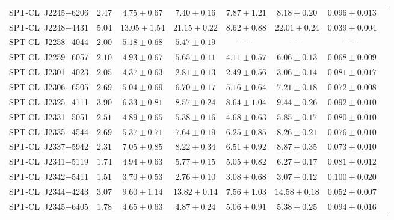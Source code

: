 \begin{table}
{\begin{tabular}{lccccccc}
    SPT-CL~J2245$-$6206    &$ 2.47 $    &$ 4.75 \pm 0.67 $    &$ 7.40 \pm 0.16 $    &$ 7.87 \pm 1.21 $     &$ 8.18 \pm 0.20 $    &$ 0.096 \pm 0.013 $    \\ 
    SPT-CL~J2248$-$4431    &$ 5.04 $    &$ 13.05 \pm 1.54 $    &$ 21.15 \pm 0.22 $    &$ 8.62 \pm 0.88 $     &$ 22.01 \pm 0.24 $    &$ 0.039 \pm 0.004 $    \\ 
    SPT-CL~J2258$-$4044    &$ 2.00 $    &$ 5.18 \pm 0.68 $    &$ 5.47 \pm 0.19 $    &$       --      $     &$       --      $    &$       --      $    \\ 
    SPT-CL~J2259$-$6057    &$ 2.10 $    &$ 4.93 \pm 0.67 $    &$ 5.65 \pm 0.11 $    &$ 4.11 \pm 0.57 $     &$ 6.06 \pm 0.13 $    &$ 0.068 \pm 0.009 $    \\ 
    SPT-CL~J2301$-$4023    &$ 2.05 $    &$ 4.37 \pm 0.63 $    &$ 2.81 \pm 0.13 $    &$ 2.49 \pm 0.56 $     &$ 3.06 \pm 0.14 $    &$ 0.081 \pm 0.017 $    \\ 
    SPT-CL~J2306$-$6505    &$ 2.69 $    &$ 5.04 \pm 0.69 $    &$ 6.70 \pm 0.17 $    &$ 5.16 \pm 0.64 $     &$ 7.21 \pm 0.18 $    &$ 0.072 \pm 0.008 $    \\ 
    SPT-CL~J2325$-$4111    &$ 3.90 $    &$ 6.33 \pm 0.81 $    &$ 8.57 \pm 0.24 $    &$ 8.64 \pm 1.04 $     &$ 9.44 \pm 0.26 $    &$ 0.092 \pm 0.010 $    \\ 
    SPT-CL~J2331$-$5051    &$ 2.51 $    &$ 4.89 \pm 0.65 $    &$ 5.38 \pm 0.16 $    &$ 4.68 \pm 0.63 $     &$ 5.85 \pm 0.17 $    &$ 0.080 \pm 0.010 $    \\ 
    SPT-CL~J2335$-$4544    &$ 2.69 $    &$ 5.37 \pm 0.71 $    &$ 7.64 \pm 0.19 $    &$ 6.25 \pm 0.85 $     &$ 8.26 \pm 0.21 $    &$ 0.076 \pm 0.010 $    \\ 
    SPT-CL~J2337$-$5942    &$ 2.31 $    &$ 7.05 \pm 0.85 $    &$ 8.22 \pm 0.34 $    &$ 6.51 \pm 0.92 $     &$ 8.87 \pm 0.35 $    &$ 0.073 \pm 0.010 $    \\ 
    SPT-CL~J2341$-$5119    &$ 1.74 $    &$ 4.94 \pm 0.63 $    &$ 5.77 \pm 0.15 $    &$ 5.05 \pm 0.82 $     &$ 6.27 \pm 0.17 $    &$ 0.081 \pm 0.012 $    \\ 
    SPT-CL~J2342$-$5411    &$ 1.51 $    &$ 3.70 \pm 0.53 $    &$ 2.76 \pm 0.10 $    &$ 3.08 \pm 0.68 $     &$ 3.07 \pm 0.12 $    &$ 0.100 \pm 0.020 $    \\ 
    SPT-CL~J2344$-$4243    &$ 3.07 $    &$ 9.60 \pm 1.14 $    &$ 13.82 \pm 0.14 $    &$ 7.56 \pm 1.03 $     &$ 14.58 \pm 0.18 $    &$ 0.052 \pm 0.007 $    \\ 
    SPT-CL~J2345$-$6405    &$ 1.78 $    &$ 4.65 \pm 0.63 $    &$ 4.87 \pm 0.24 $    &$ 5.06 \pm 0.91 $     &$ 5.38 \pm 0.25 $    &$ 0.094 \pm 0.016 $    \\ 

\end{tabular}}
\end{table}
